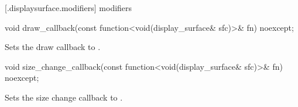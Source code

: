  [\iotwod.displaysurface.modifiers]{ modifiers}

\begin{itemdecl}
void draw_callback(const function<void(display_surface& sfc)>& fn) noexcept;
\end{itemdecl}
\begin{itemdescr}
\pnum
\effects
Sets the draw callback to .
\end{itemdescr}

\begin{itemdecl}
void size_change_callback(const function<void(display_surface& sfc)>& fn)
  noexcept;
\end{itemdecl}
\begin{itemdescr}
\pnum
\effects
Sets the size change callback to .
\end{itemdescr}

